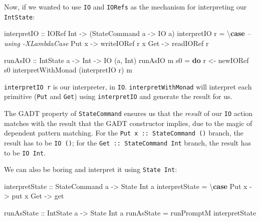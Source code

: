 \documentclass[]{article}
\newenvironment{Shaded}{}{}
\newcommand{\CommentTok}[1]{\textcolor[rgb]{0.38,0.63,0.69}{\textit{#1}}}
\newcommand{\DataTypeTok}[1]{\textcolor[rgb]{0.56,0.13,0.00}{#1}}
\newcommand{\FunctionTok}[1]{\textcolor[rgb]{0.02,0.16,0.49}{#1}}
\newcommand{\KeywordTok}[1]{\textcolor[rgb]{0.00,0.44,0.13}{\textbf{#1}}}
\newcommand{\NormalTok}[1]{#1}
\newcommand{\OtherTok}[1]{\textcolor[rgb]{0.00,0.44,0.13}{#1}}
\begin{document}
Now, if we wanted to use \texttt{IO} and \texttt{IORefs} as the mechanism for
interpreting our \texttt{IntState}:

\begin{Shaded}
\begin{Highlighting}[]
\OtherTok{interpretIO ::} \DataTypeTok{IORef} \DataTypeTok{Int} \OtherTok{->}\NormalTok{ (}\DataTypeTok{StateCommand}\NormalTok{ a }\OtherTok{->} \DataTypeTok{IO}\NormalTok{ a)}
\NormalTok{interpretIO r }\FunctionTok{=}\NormalTok{ \textbackslash{}}\KeywordTok{case}           \CommentTok{-- using -XLambdaCase}
    \DataTypeTok{Put}\NormalTok{ x }\OtherTok{->}\NormalTok{ writeIORef r x}
    \DataTypeTok{Get}   \OtherTok{->}\NormalTok{ readIORef r}

\OtherTok{runAsIO ::} \DataTypeTok{IntState}\NormalTok{ a }\OtherTok{->} \DataTypeTok{Int} \OtherTok{->} \DataTypeTok{IO}\NormalTok{ (a, }\DataTypeTok{Int}\NormalTok{)}
\NormalTok{runAsIO m s0 }\FunctionTok{=} \KeywordTok{do}
\NormalTok{    r }\OtherTok{<-}\NormalTok{ newIORef s0}
\NormalTok{    interpretWithMonad (interpretIO r) m}
\end{Highlighting}
\end{Shaded}

\texttt{interpretIO\ r} is our interpreter, in \texttt{IO}.
\texttt{interpretWithMonad} will interpret each primitive (\texttt{Put} and
\texttt{Get}) using \texttt{interpretIO} and generate the result for us.

The GADT property of \texttt{StateCommand} ensures us that the \emph{result} of
our \texttt{IO} action matches with the result that the GADT constructor
implies, due to the magic of dependent pattern matching. For the
\texttt{Put\ x\ ::\ StateCommand\ ()} branch, the result has to be
\texttt{IO\ ()}; for the \texttt{Get\ ::\ StateCommand\ Int} branch, the result
has to be \texttt{IO\ Int}.

We can also be boring and interpret it using \texttt{State\ Int}:

\begin{Shaded}
\begin{Highlighting}[]
\OtherTok{interpretState ::} \DataTypeTok{StateCommand}\NormalTok{ a }\OtherTok{->} \DataTypeTok{State} \DataTypeTok{Int}\NormalTok{ a}
\NormalTok{interpretState }\FunctionTok{=}\NormalTok{ \textbackslash{}}\KeywordTok{case}
    \DataTypeTok{Put}\NormalTok{ x }\OtherTok{->}\NormalTok{ put x}
    \DataTypeTok{Get}   \OtherTok{->}\NormalTok{ get}

\OtherTok{runAsState ::} \DataTypeTok{IntState}\NormalTok{ a }\OtherTok{->} \DataTypeTok{State} \DataTypeTok{Int}\NormalTok{ a}
\NormalTok{runAsState }\FunctionTok{=}\NormalTok{ runPromptM interpretState}
\end{Highlighting}
\end{Shaded}
\end{document}
